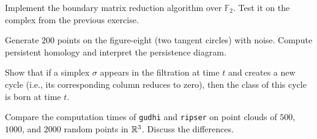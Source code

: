 \begin{exercise}
Implement the boundary matrix reduction algorithm over $\mathbb{F}_2$.
Test it on the complex from the previous exercise.
\end{exercise}

\begin{exercise}
Generate $200$ points on the figure-eight (two tangent circles) with
noise. Compute persistent homology and interpret the persistence
diagram.
\end{exercise}

\begin{exercise}
Show that if a simplex $\sigma$ appears in the filtration at time $t$
and creates a new cycle (i.e., its corresponding column reduces to
zero), then the class of this cycle is born at time $t$.
\end{exercise}

\begin{exercise}
Compare the computation times of \texttt{gudhi} and \texttt{ripser} on
point clouds of $500$, $1000$, and $2000$ random points in $\mathbb{R}^3$.
Discuss the differences.
\end{exercise}
